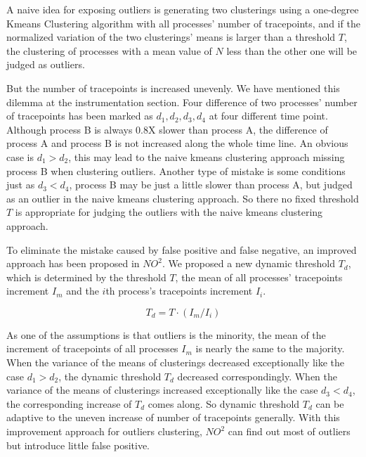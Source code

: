 A naive idea for exposing outliers is generating two clusterings using a one-degree Kmeans
Clustering algorithm with all processes' number of tracepoints, and if the normalized
variation of the two clusterings' means is larger than a threshold $T$, the clustering of
processes with a mean value of $N$ less than the other one will be judged as outliers.

But the number of tracepoints is increased unevenly. We have mentioned this dilemma at the
instrumentation section. Four difference of two processes' number of tracepoints has been
marked as $d_1, d_2, d_3, d_4$ at four different time point. Although process B is always
0.8X slower than process A, the difference of process A and process B is not increased
along the whole time line. An obvious case is $d_1 > d_2$, this may lead to the naive
kmeans clustering approach missing process B when clustering outliers. Another type of
mistake is some conditions just as $d_3 < d_4$, process B may be just a little slower than
process A, but judged as an outlier in the naive kmeans clustering approach. So there no
fixed threshold $T$ is appropriate for judging the outliers with the naive kmeans
clustering approach.

To eliminate the mistake caused by false positive and false negative, an improved approach
has been proposed in $NO^2$. We proposed a new dynamic threshold $T_d$, which is
determined by the threshold $T$, the mean of all processes' tracepoints increment $I_m$
and the $i$th process's tracepoints increment $I_i$.

$$T_d = T \cdot (I_m / I_i)$$

As one of the assumptions is that outliers is the minority, the mean of the increment of
tracepoints of all processes $I_m$ is nearly the same to the majority. When the variance
of the means of clusterings decreased exceptionally like the case $d_1 > d_2$, the dynamic
threshold $T_d$ decreased correspondingly. When the variance of the means of clusterings
increased exceptionally like the case $d_3 < d_4$, the corresponding increase of $T_d$
comes along. So dynamic threshold $T_d$ can be adaptive to the uneven increase of number
of tracepoints generally. With this improvement approach for outliers clustering, $NO^2$
can find out most of outliers but introduce little false positive. 

